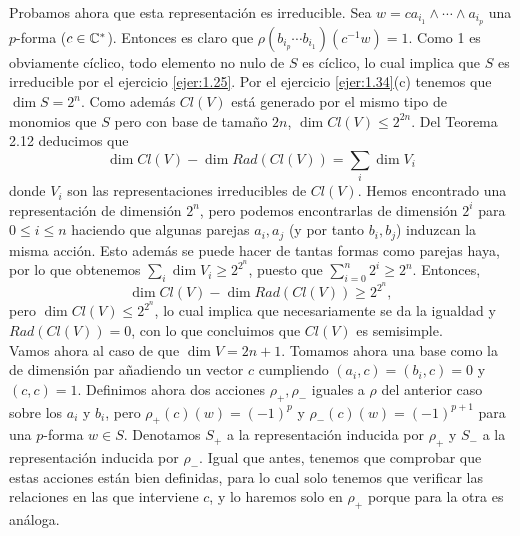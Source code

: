 \documentclass[twoside]{article}
\begin{document}
\begin{enumerate}[(i)]
Probamos ahora que esta representación es irreducible. Sea $w=ca_{i_1}\land\cdots\land a_{i_p}$ una $p$-forma ($c\in\mathbb{C}^*$). Entonces es claro que $\rho(b_{i_p}\cdots b_{i_1})(c^{-1}w)=1$. Como 1 es obviamente cíclico, todo elemento no nulo de $S$ es cíclico, lo cual implica que $S$ es irreducible por el ejercicio \ref{ejer:1.25}. Por el ejercicio \ref{ejer:1.34}(c) tenemos que $\dim S=2^n$. Como además $Cl(V)$ está generado por el mismo tipo de monomios que $S$ pero con base de tamaño $2n$, $\dim Cl(V)\leq 2^{2n}$. Del Teorema 2.12 deducimos que 
$$\dim Cl(V)-\dim Rad(Cl(V))=\sum_i\dim V_i$$ 
donde $V_i$ son las representaciones irreducibles de $Cl(V)$. Hemos encontrado una representación de dimensión $2^n$, pero podemos encontrarlas de dimensión $2^i$ para  $0\leq i\leq n$ haciendo que algunas parejas $a_i,a_j$ (y por tanto $b_i,b_j$) induzcan la misma acción. Esto además se puede hacer de tantas formas como parejas haya, por lo que obtenemos $\sum_i\dim V_i\geq 2^{2^n}$, puesto que $\sum_{i=0}^n2^i\geq 2^n$. Entonces, $$\dim Cl(V)-\dim Rad(Cl(V))\geq 2^{2^n},$$ pero $\dim Cl(V)\leq 2^{2^n}$, lo cual implica que necesariamente se da la igualdad y $Rad(Cl(V))=0$, con lo que concluimos que $Cl(V)$ es semisimple.\\

Vamos ahora al caso de que $\dim V=2n+1$. Tomamos ahora una base como la de dimensión par añadiendo un vector $c$ cumpliendo $(a_i,c)=(b_i,c)=0$ y $(c,c)=1$. Definimos ahora dos acciones $\rho_+,\rho_-$ iguales a $\rho$ del anterior caso sobre los $a_i$ y $b_i$, pero $\rho_+(c)(w)=(-1)^p$ y $\rho_-(c)(w)=(-1)^{p+1}$ para una $p$-forma $w\in S$. Denotamos $S_+$ a la representación inducida por $\rho_+$ y $S_-$ a la representación inducida por $\rho_-$. Igual que antes, tenemos que comprobar que estas acciones están bien definidas, para lo cual solo tenemos que verificar las relaciones en las que interviene $c$, y lo haremos solo en $\rho_+$ porque para la otra es análoga.


\end{enumerate}
\end{document}
